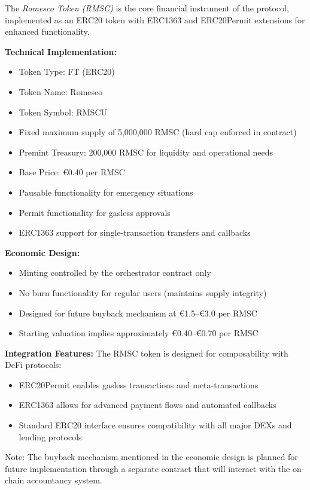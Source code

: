 \documentclass[conference]{IEEEtran}
\begin{document}
The \textit{Romesco Token (RMSC)} is the core financial instrument of the protocol, implemented as an ERC20 token with ERC1363 and ERC20Permit extensions for enhanced functionality.

\textbf{Technical Implementation:}
\begin{itemize}
    \item Token Type: FT (ERC20)
    \item Token Name: Romesco
    \item Token Symbol: RMSCU
    \item Fixed maximum supply of 5,000,000 RMSC (hard cap enforced in contract)
    \item Premint Treasury: 200,000 RMSC for liquidity and operational needs
    \item Base Price: €0.40 per RMSC
    \item Pausable functionality for emergency situations
    \item Permit functionality for gasless approvals
    \item ERC1363 support for single-transaction transfers and callbacks
\end{itemize}

\textbf{Economic Design:}
\begin{itemize}
    \item Minting controlled by the orchestrator contract only
    \item No burn functionality for regular users (maintains supply integrity)
    \item Designed for future buyback mechanism at €1.5–€3.0 per RMSC
    \item Starting valuation implies approximately €0.40–€0.70 per RMSC
\end{itemize}

\textbf{Integration Features:}
The RMSC token is designed for composability with DeFi protocols:
\begin{itemize}
    \item ERC20Permit enables gasless transactions and meta-transactions
    \item ERC1363 allows for advanced payment flows and automated callbacks
    \item Standard ERC20 interface ensures compatibility with all major DEXs and lending protocols
\end{itemize}

Note: The buyback mechanism mentioned in the economic design is planned for future implementation through a separate contract that will interact with the on-chain accountancy system.
\end{document}
